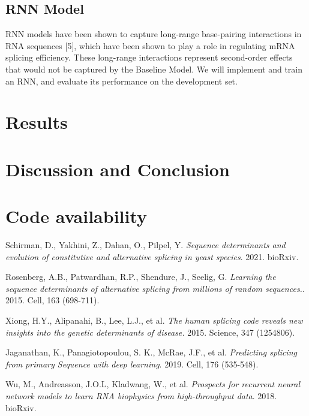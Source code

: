 \documentclass[10.5pt]{article}
\begin{document}
\subsection{RNN Model}
RNN models have been shown to capture long-range base-pairing interactions in RNA sequences [5], which have been shown to play a role in regulating mRNA splicing efficiency. These long-range interactions represent second-order effects that would not be captured by the Baseline Model. We will implement and train an RNN, and evaluate its performance on the development set.
\section{Results}
\section{Discussion and Conclusion}
\section{Code availability}

\begin{thebibliography}{9}
Schirman, D., Yakhini, Z., Dahan, O., Pilpel, Y.
\textit{Sequence determinants and evolution of constitutive and alternative splicing in yeast species}. 2021. bioRxiv. 

Rosenberg, A.B., Patwardhan, R.P., Shendure, J., Seelig, G.
\textit{Learning the sequence determinants of alternative splicing from millions of random sequences.}. 2015. Cell, 163 (698-711). 

Xiong, H.Y., Alipanahi, B., Lee, L.J., et al. 
\textit{The human splicing code reveals new insights into the genetic determinants of disease.} 2015. Science, 347 (1254806).

Jaganathan, K., Panagiotopoulou, S. K., McRae, J.F., et al. 
\textit{Predicting splicing from primary Sequence with deep learning}. 2019. Cell, 176 (535-548). 

Wu, M., Andreasson, J.O.L, Kladwang, W., et al. \textit{Prospects for recurrent neural network models to learn RNA
biophysics from high-throughput data}. 2018. bioRxiv.
\end{thebibliography}
\end{document}
